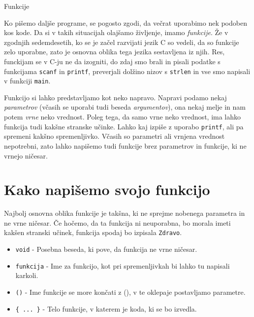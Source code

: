 
Funkcije

Ko pišemo daljše programe, se pogosto zgodi, da večrat uporabimo nek podoben
kos kode. Da si v takih situacijah olajšamo življenje, imamo \emph{funkcije}.
Že v zgodnjih sedemdesetih, ko se je začel razvijati jezik C so vedeli, da so
funkcije zelo uporabne, zato je osnovna oblika tega jezika sestavljena iz njih.
Res, funckijam se v C-ju ne da izogniti, do zdaj smo brali in pisali podatke s
funkcijama \verb+scanf+ in \verb+printf+, preverjali dolžino nizov s
\verb+strlen+ in vse smo napisali v funkciji \verb+main+.

Funkcijo si lahko predstavljamo kot neko napravo. Napravi podamo nekaj
\emph{parametrov} (včasih se uporabi tudi beseda \emph{argumentov}), ona nekaj
melje in nam potem \emph{vrne} neko vrednost. Poleg tega, da samo vrne neko
vrednost, ima lahko funkcija tudi kakšne stranske učinke. Lahko kaj izpiše z
uporabo \verb+printf+, ali pa spremeni kakšno spremenljivko. Včasih so
parametri ali vrnjena vrednost nepotrebni, zato lahko napišemo tudi funkcije
brez parametrov in funkcije, ki ne vrnejo ničesar.


\section{Kako napišemo svojo funkcijo}

Najbolj osnovna oblika funkcije je takšna, ki ne sprejme nobenega parametra in
ne vrne ničesar. Če hočemo, da ta funkcija ni neuporabna, bo morala imeti
kakšen stranski učinek, funkcija spodaj bo izpisala \verb+Zdravo+.

\begin{examples}
\end{examples}

\begin{itemize}
    \item \verb+void+ - Posebna beseda, ki pove, da funkcija ne vrne ničesar.
    \item \verb+funkcija+ - Ime za funkcijo, kot pri spremenljivkah bi lahko tu
        napisali karkoli.
    \item \verb+()+ - Ime funkcije se more končati z (), v te oklepaje
        postavljamo parametre.
    \item \verb+{ ... }+ - Telo funkcije, v katerem je koda, ki se bo izvedla.
\end{itemize}

